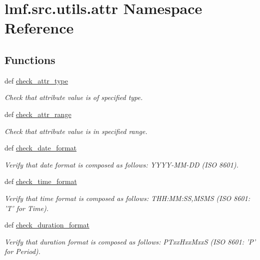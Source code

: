 \hypertarget{namespacelmf_1_1src_1_1utils_1_1attr}{\section{lmf.\+src.\+utils.\+attr Namespace Reference}
\label{namespacelmf_1_1src_1_1utils_1_1attr}
}
\subsection*{Functions}
\begin{DoxyCompactItemize}
\item 
def \hyperlink{namespacelmf_1_1src_1_1utils_1_1attr_aa8f0e87d43935a26d71b5f80fc0de8a1}{check\+\_\+attr\+\_\+type}
\begin{DoxyCompactList}\small\item\em Check that attribute value is of specified type. \end{DoxyCompactList}\item 
def \hyperlink{namespacelmf_1_1src_1_1utils_1_1attr_aae5498ab6d173de4b16ab91d720c4320}{check\+\_\+attr\+\_\+range}
\begin{DoxyCompactList}\small\item\em Check that attribute value is in specified range. \end{DoxyCompactList}\item 
def \hyperlink{namespacelmf_1_1src_1_1utils_1_1attr_ab6af62c51372696dd382ca4033f83b0c}{check\+\_\+date\+\_\+format}
\begin{DoxyCompactList}\small\item\em Verify that date format is composed as follows\+: Y\+Y\+Y\+Y-\/\+M\+M-\/\+D\+D (I\+S\+O 8601). \end{DoxyCompactList}\item 
def \hyperlink{namespacelmf_1_1src_1_1utils_1_1attr_aa6dbeae49e33dc745ca773965d480398}{check\+\_\+time\+\_\+format}
\begin{DoxyCompactList}\small\item\em Verify that time format is composed as follows\+: T\+H\+H\+:\+M\+M\+:S\+S,M\+S\+M\+S (I\+S\+O 8601\+: 'T' for Time). \end{DoxyCompactList}\item 
def \hyperlink{namespacelmf_1_1src_1_1utils_1_1attr_a0a84f88a9da96b86cbdd70482c97b5e4}{check\+\_\+duration\+\_\+format}
\begin{DoxyCompactList}\small\item\em Verify that duration format is composed as follows\+: P\+Txx\+Hxx\+Mxx\+S (I\+S\+O 8601\+: 'P' for Period). \end{DoxyCompactList}\end{DoxyCompactItemize}


